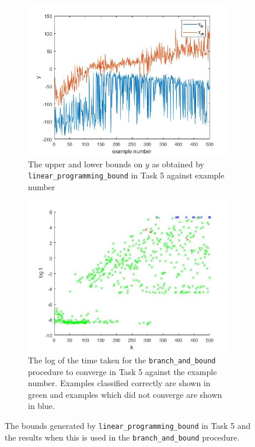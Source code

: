 \documentclass[11pt]{article}
\begin{document}
\begin{figure}
    \centering
    \begin{subfigure}{.5\textwidth} 
        \centering \includegraphics[width=0.8\columnwidth]{Figures/Task5.jpg}
        \caption{The upper and lower bounds on $y$ as obtained by \texttt{linear\_programming\_bound} in Task 5 against example number}
        \label{fig:Task5a}
    \end{subfigure}%
    \begin{subfigure}{.5\textwidth} 
        \centering \includegraphics[width=0.8\columnwidth]{Figures/Task5bandb.jpg}
        \caption{The log of the time taken for the \texttt{branch\_and\_bound} procedure to converge in Task 5 against the example number. Examples classified correctly are shown in green and examples which did not converge are shown in blue.}
        \label{fig:Task5b}
    \end{subfigure}
    \caption{The bounds generated by \texttt{linear\_programming\_bound} in Task 5 and the results when this is used in the \texttt{branch\_and\_bound} procedure.}
    \label{fig:Task5}
\end{figure}
\end{document}
